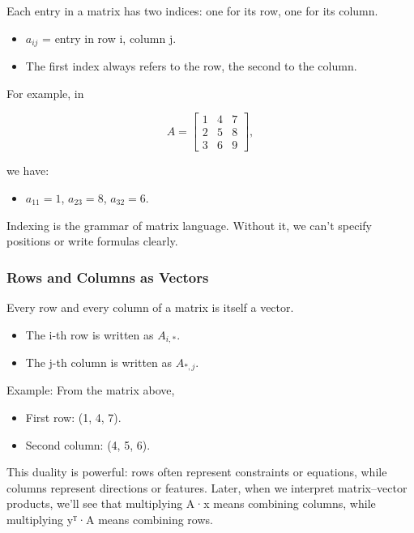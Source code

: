 \documentclass[
  letterpaper,
  DIV=11,
  numbers=noendperiod]{scrreprt}
\providecommand{\tightlist}{%
  \setlength{\itemsep}{0pt}\setlength{\parskip}{0pt}}
\begin{document}
Each entry in a matrix has two indices: one for its row, one for its
column.

\begin{itemize}
\tightlist
\item
  \(a_{ij}\) = entry in row i, column j.
\item
  The first index always refers to the row, the second to the column.
\end{itemize}

For example, in

\[
A = \begin{bmatrix} 
1 & 4 & 7 \\ 
2 & 5 & 8 \\ 
3 & 6 & 9 
\end{bmatrix},
\]

we have:

\begin{itemize}
\tightlist
\item
  \(a_{11} = 1\), \(a_{23} = 8\), \(a_{32} = 6\).
\end{itemize}

Indexing is the grammar of matrix language. Without it, we can't specify
positions or write formulas clearly.

\subsubsection{Rows and Columns as
Vectors}\label{rows-and-columns-as-vectors}

Every row and every column of a matrix is itself a vector.

\begin{itemize}
\tightlist
\item
  The i-th row is written as \(A_{i,*}\).
\item
  The j-th column is written as \(A_{*,j}\).
\end{itemize}

Example: From the matrix above,

\begin{itemize}
\tightlist
\item
  First row: (1, 4, 7).
\item
  Second column: (4, 5, 6).
\end{itemize}

This duality is powerful: rows often represent constraints or equations,
while columns represent directions or features. Later, when we interpret
matrix--vector products, we'll see that multiplying A·x means combining
columns, while multiplying yᵀ·A means combining rows.
\end{document}
